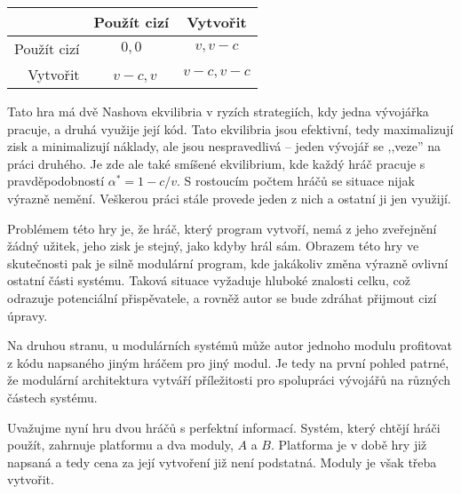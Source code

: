 \begin{multicols}{2}
		\begin{Figure}
		\begin{center}
		\begin{tabular}{r| c c}
				& Použít cizí & Vytvořit \\
				\hline
			Použít cizí & $0,0$ &\cellcolor{gray!20} $v, v-c$ \\
			Vytvořit &\cellcolor{gray!20} $v-c, v$ & $v-c, v-c$ \\
		\end{tabular}
		\end{center}
		\label{tab:involuntary-altruism-nf}
		\end{Figure}

		Tato hra má dvě Nashova ekvilibria v ryzích strategiích, kdy jedna vývojářka pracuje, a druhá využije její kód. Tato ekvilibria jsou efektivní, tedy maximalizují zisk a minimalizují náklady, ale jsou nespravedlivá -- jeden vývojář se ,,veze'' na práci druhého. Je zde ale také smíšené ekvilibrium, kde  každý hráč pracuje s pravděpodobností $\alpha^* = 1-c/v$. S rostoucím počtem hráčů se situace nijak výrazně nemění. Veškerou práci stále provede jeden z nich a ostatní ji jen využijí.

		Problémem této hry je, že hráč, který program vytvoří, nemá z jeho zveřejnění žádný užitek, jeho zisk je stejný, jako kdyby hrál sám. Obrazem této hry ve skutečnosti pak je silně modulární program, kde jakákoliv změna výrazně ovlivní ostatní části systému. Taková situace vyžaduje hluboké znalosti celku, což odrazuje potenciální přispěvatele, a rovněž autor se bude zdráhat přijmout cizí úpravy.

		Na druhou stranu, u modulárních systémů může autor jednoho modulu profitovat z kódu napsaného jiným hráčem pro jiný modul. Je tedy na první pohled patrné, že modulární architektura vytváří příležitosti pro spolupráci vývojářů na různých částech systému.

		Uvažujme nyní hru dvou hráčů s perfektní informací. Systém, který chtějí hráči použít, zahrnuje platformu a dva moduly, $A$ a $B$. Platforma je v době hry již napsaná a tedy cena za její vytvoření již není podstatná. Moduly je však třeba vytvořit.



\end{multicols}
